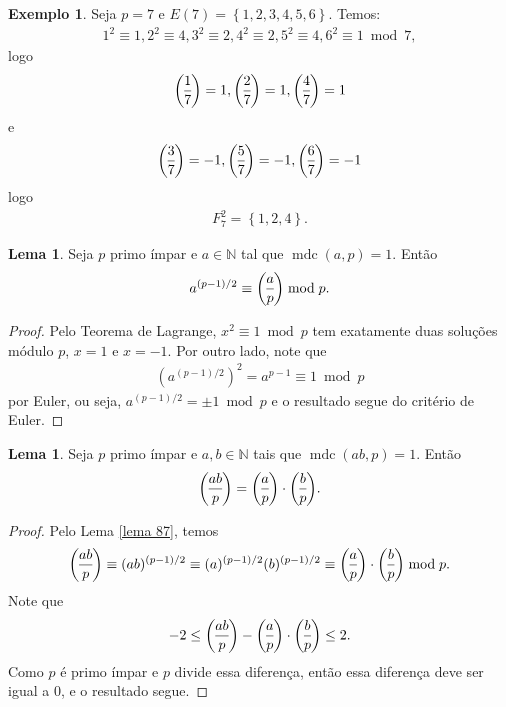 \documentclass[a4paper,11pt,twoside, leqno]{article}
\DeclareMathOperator{\mdc}{mdc}
\newcommand{\genlegendre}[4]{%
	\genfrac{(}{)}{}{#1}{#3}{#4}%
	\if\relax\detokenize{#2}\relax\else_{\!#2}\fi
}
\newcommand{\legendre}[3][]{\genlegendre{}{#1}{#2}{#3}}
\theoremstyle{definition}
\newtheorem{lemma}[theorem]{Lema}
\newtheorem*{example}{Exemplo}
\begin{document}
\begin{example}
	Seja $p=7$ e $E(7) = \left\{ 1,2,3,4,5,6 \right\}$. Temos:
	\begin{align*}
	1^2\equiv 1, 2^2\equiv 4, 3^2\equiv 2, 4^2\equiv 2, 5^2\equiv 4, 6^2\equiv 1\bmod 7,
	\end{align*}
	logo
	\begin{align*}
	\legendre[]{1}{7} = 1, \legendre[]{2}{7} = 1, \legendre[]{4}{7} = 1
	\end{align*}
	e 
	\begin{align*}
	\legendre[]{3}{7} = -1, \legendre[]{5}{7} = -1, \legendre[]{6}{7} = -1
	\end{align*}
	logo
	\begin{align*}
	F_7^2 = \left\{ 1,2,4 \right\}.
	\end{align*}
\end{example}
\begin{lemma}
	\label{lema 87}
	Seja $p$ primo ímpar e $a\in\mathbb{N}$ tal que $\mdc(a,p) = 1$. Então
	\begin{align*}
	a^{(p-1)/2}\equiv\legendre[]{a}{p}\bmod p.
	\end{align*}
\end{lemma}
\begin{proof}
	Pelo Teorema de Lagrange, $x^2\equiv 1\bmod p$ tem exatamente duas soluções módulo $p$, $x = 1$ e $x = -1$. Por outro lado, note que
	\begin{align*}
	\left( a^{(p-1)/2} \right)^2 = a^{p-1} \equiv 1\bmod p
	\end{align*}
	por Euler, ou seja, $a^{(p-1)/2} = \pm 1\bmod p$ e o resultado segue do critério de Euler. 
\end{proof}
\begin{lemma}
	\label{lema 88}
	Seja $p$ primo ímpar e $a,b\in\mathbb{N}$ tais que $\mdc(ab,p) = 1$. Então
	\begin{align*}
	\legendre[]{ab}{p} = \legendre[]{a}{p}\cdot\legendre[]{b}{p}.
	\end{align*}
\end{lemma}
\begin{proof}
	Pelo Lema \eqref{lema 87}, temos
	\begin{align*}
	\legendre[]{ab}{p}\equiv (ab)^{(p-1)/2} \equiv (a)^{(p-1)/2}(b)^{(p-1)/2} \equiv \legendre[]{a}{p}\cdot\legendre[]{b}{p}\bmod p.
	\end{align*}
	Note que
	\begin{align*}
	-2\leq \legendre[]{ab}{p} - \legendre[]{a}{p}\cdot\legendre[]{b}{p} \leq 2.
	\end{align*}
	Como $p$ é primo ímpar e $p$ divide essa diferença, então essa diferença deve ser igual a $0$, e o resultado segue.
\end{proof}
\end{document}
